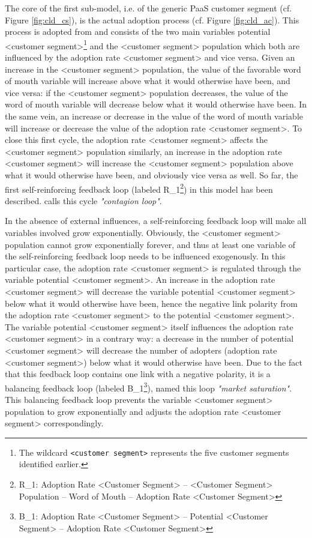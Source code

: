 The core of the first sub-model, i.e. of the generic \ac{PaaS} customer segment (cf. Figure \ref{fig:cld_cs}), is the actual adoption process (cf. Figure \ref{fig:cld_ac}). This process is adopted from \citet[p. 18]{Sterman2001} and consists of the two main variables potential <customer segment>\footnote{The wildcard \texttt{<customer segment>} represents the five customer segments identified  earlier.} and the <customer segment> population which both are influenced by the adoption rate <customer segment> and vice versa. Given an increase in the <customer segment> population, the value of the favorable word of mouth variable will increase above what it would otherwise have been, and vice versa: if the <customer segment> population decreases, the value of the word of mouth variable will decrease below what it would otherwise have been. In the same vein, an increase or decrease in the value of the word of mouth variable will increase or decrease the value of the adoption rate <customer segment>. To close this first cycle, the adoption rate <customer segment> affects the <customer segment> population similarly, an increase in the adoption rate <customer segment> will increase the <customer segment> population above what it would otherwise have been, and obviously vice versa as well. So far, the first self-reinforcing feedback loop (labeled R\_1\footnote{R\_1: Adoption Rate <Customer Segment> -- <Customer Segment> Population -- Word of Mouth -- Adoption Rate <Customer Segment>}) in this model has been described. \citet[p. 19]{Sterman2001} calls this cycle \textit{"contagion loop"}. 

In the absence of external influences, a self-reinforcing feedback loop will make all variables involved grow exponentially. Obviously, the <customer segment> population cannot grow exponentially forever, and thus at least one variable of the self-reinforcing feedback loop needs to be influenced exogenously. In this particular case, the adoption rate <customer segment> is regulated through the variable potential <customer segment>. An increase in the adoption rate <customer segment> will decrease the variable potential <customer segment> below what it would otherwise have been, hence the negative link polarity from the adoption rate <customer segment> to the potential <customer segment>. The variable potential <customer segment> itself influences the adoption rate <customer segment> in a contrary way: a decrease in the number of potential <customer segment> will decrease the number of adopters (adoption rate <customer segment>) below what it would otherwise have been. Due to the fact that this feedback loop contains one link with a negative polarity, it is a balancing feedback loop (labeled B\_1\footnote{B\_1: Adoption Rate <Customer Segment> -- Potential <Customer Segment> -- Adoption Rate <Customer Segment>}), \citet[p. 18]{Sterman2001} named this loop \textit{"market saturation"}. This balancing feedback loop prevents the variable <customer segment> population to grow exponentially and adjusts the adoption rate <customer segment> correspondingly.

